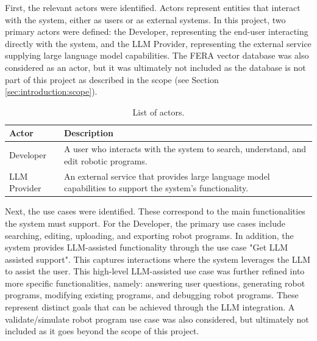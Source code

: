 First, the relevant actors were identified. Actors represent entities that interact with the system, either as users or as external systems. In this project, two primary actors were defined: the Developer, representing the end-user interacting directly with the system, and the LLM Provider, representing the external service supplying large language model capabilities. The FERA vector database was also considered as an actor, but it was ultimately not included as the database is not part of this project as described in the scope (see Section \ref{sec:introduction:scope}).

\begin{table}[H]
    \centering
    \begin{tabular}{p{2.5cm}p{11.5cm}}
        \toprule
        \textbf{Actor} & \textbf{Description}                                                                                       \\
        \midrule
        Developer      & A user who interacts with the system to search, understand, and edit robotic programs.                     \\
        LLM Provider   & An external service that provides large language model capabilities to support the system's functionality. \\
        \bottomrule
    \end{tabular}
    \caption{List of actors.}
    \label{tab:requirement-engineering:actors}
\end{table}

\vspace{-0.1cm}
Next, the use cases were identified. These correspond to the main functionalities the system must support. For the Developer, the primary use cases include searching, editing, uploading, and exporting robot programs. In addition, the system provides LLM-assisted functionality through the use case "Get LLM assisted support". This captures interactions where the system leverages the LLM to assist the user. This high-level LLM-assisted use case was further refined into more specific functionalities, namely: answering user questions, generating robot programs, modifying existing programs, and debugging robot programs. These represent distinct goals that can be achieved through the LLM integration. A validate/simulate robot program use case was also considered, but ultimately not included as it goes beyond the scope of this project.


